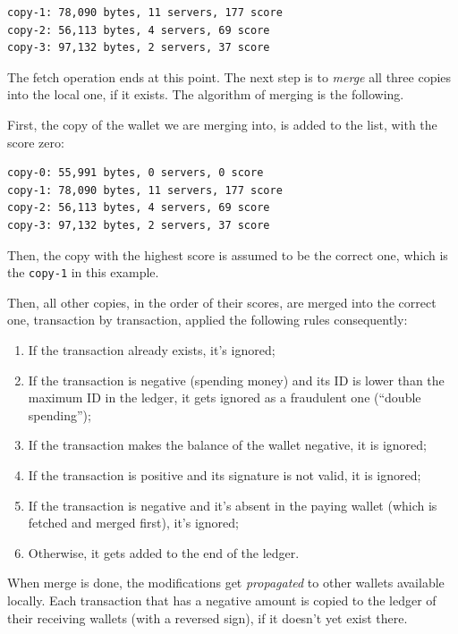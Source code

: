 \documentclass[11pt,oneside]{article}
\newcommand\dd[1]{\colorbox{gray!30}{\texttt{#1}}}
\begin{document}
\begin{verbatim}
copy-1: 78,090 bytes, 11 servers, 177 score
copy-2: 56,113 bytes, 4 servers, 69 score
copy-3: 97,132 bytes, 2 servers, 37 score
\end{verbatim}

The fetch operation ends at this point. The next step is to \emph{merge}
all three copies into the local one, if it exists. The algorithm of merging
is the following.

First, the copy of the wallet we are merging into, is added to the list,
with the score zero:

\begin{verbatim}
copy-0: 55,991 bytes, 0 servers, 0 score
copy-1: 78,090 bytes, 11 servers, 177 score
copy-2: 56,113 bytes, 4 servers, 69 score
copy-3: 97,132 bytes, 2 servers, 37 score
\end{verbatim}

Then, the copy with the highest score is assumed to be the correct one,
which is the \dd{copy-1} in this example.

Then, all other copies, in the order of their scores, are merged into the
correct one, transaction by transaction, applied the following rules
consequently:

\begin{enumerate}
\item If the transaction already exists, it's ignored;
\item If the transaction is negative (spending money) and its ID is lower than
the maximum ID in the ledger, it gets ignored as a fraudulent one (``double spending'');
\item If the transaction makes the balance of the wallet negative, it is ignored;
\item If the transaction is positive and its signature is not valid, it is ignored;
\item If the transaction is negative and it's absent in the paying wallet
(which is fetched and merged first), it's ignored;
\item Otherwise, it gets added to the end of the ledger.
\end{enumerate}

When merge is done, the modifications get \emph{propagated} to other wallets
available locally. Each transaction that has a negative amount is
copied to the ledger of their receiving wallets (with a reversed sign),
if it doesn't yet exist there.

\end{document}
